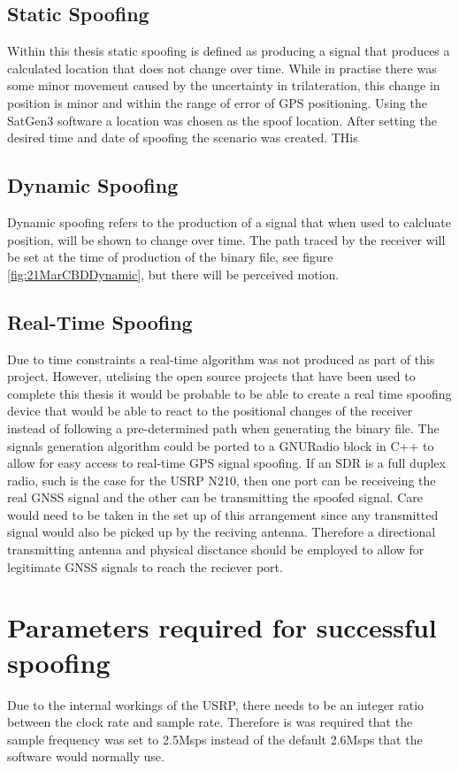 \subsection{Static Spoofing}
Within this thesis static spoofing is defined as producing a signal that produces a calculated location that does not change over time. While in practise there was some
minor movement caused by the uncertainty in trilateration, this change in position is minor and within the range of error of GPS positioning.
Using the SatGen3 software a location was chosen as the spoof location. After setting the desired time and date of spoofing the scenario was created. THis 

\subsection{Dynamic Spoofing}
Dynamic spoofing refers to the production of a signal that when used to calcluate position, will be shown to change over time. The path traced by the receiver will be
set at the time of production of the binary file, see figure \ref{fig:21MarCBDDynamic}, but there will be perceived motion.

\subsection{Real-Time Spoofing}
Due to time constraints a real-time algorithm was not produced as part of this project. However, utelising the open source projects that have been used to complete this
thesis it would be probable to be able to create a real time spoofing device that would be able to react to the positional changes of the receiver instead of following a
pre-determined path when generating the binary file. The signals generation algorithm could be ported to a GNURadio block in C++ to allow for easy access to real-time GPS
signal spoofing. If an SDR is a full duplex radio, such is the case for the USRP N210, then one port can be receiveing the real GNSS signal and the other can be
transmitting the spoofed signal. Care would need to be taken in the set up of this arrangement since any transmitted signal would also be picked up by the reciving
antenna. Therefore a directional transmitting antenna and physical disctance should be employed to allow for legitimate GNSS signals to reach the reciever port. 

\section{Parameters required for successful spoofing}
Due to the internal workings of the USRP, there needs to be an integer ratio between the clock rate and sample rate. Therefore is was required that the sample frequency
was set to 2.5Msps instead of the default 2.6Msps that the software would normally use.


